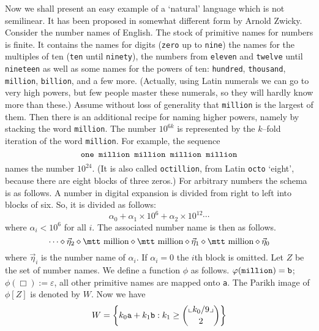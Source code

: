 Now we shall present an easy example of a `natural' language
which is not semilinear. It has been proposed in somewhat different
form by Arnold Zwicky. Consider the number names of English.
The stock of primitive names for numbers is finite. It contains
the names for digits ({\tt zero} up to {\tt nine}) the names
for the multiples of ten ({\tt ten} until {\tt ninety}), the numbers
from {\tt eleven} and {\tt twelve} until {\tt nineteen} as well as
some names for the powers of ten: {\tt hundred}, {\tt thousand},
{\tt million}, {\tt billion}, and a few more. (Actually, using
Latin numerals we can go to very high powers, but few people master
these numerals, so they will hardly know more than these.)
Assume without loss of generality that {\tt million} is the
largest of them. Then there is an additional recipe for naming
higher powers, namely by stacking the word {\tt million}. The
number $10^{6k}$ is represented by the $k$--fold iteration of
the word {\tt million}. For example, the sequence 
\begin{equation}
\mbox{\tt one million million million million} 
\end{equation}
names the number $10^{24}$. (It is also called {\tt octillion}, 
from Latin {\tt octo} `eight', because there are eight blocks 
of three zeros.) For arbitrary numbers the schema is as follows. A number 
in digital expansion is divided from right to left into blocks of six. 
So, it is divided as follows:
\begin{equation}
\alpha_0 + \alpha_1 \times 10^6 + \alpha_2 \times 10^{12} \dotsb
\end{equation}
where $\alpha_i < 10^6$ for all $i$. The associated number name is 
then as follows.
\begin{equation}
\dotsb\oconc\vec{\eta}_2\oconc\mbox{\mtt million}\oconc%
\mbox{\mtt million}\oconc\vec{\eta}_1\oconc\mbox{\mtt million}
\oconc\vec{\eta}_0
\end{equation}
where $\vec{\eta}_i$ is the number name of $\alpha_i$.
If $\alpha_i = 0$ the $i$th block is omitted. Let $Z$ be the set 
of number names. We define a function $\phi$ as follows. 
$\phi({\tt million}) = \mbox{\tt b}$; $\phi(\Box) := \varepsilon$, 
all other primitive names are mapped onto {\tt a}. The Parikh image 
of $\phi[Z]$ is denoted by $W$. Now we have
\begin{equation}
W = \left\{ k_0\mbox{\tt a} + k_1 \mbox{\tt b} : k_1 \geq {{\llcorner
k_0/9\lrcorner}\choose 2}\right\} 
\end{equation}
